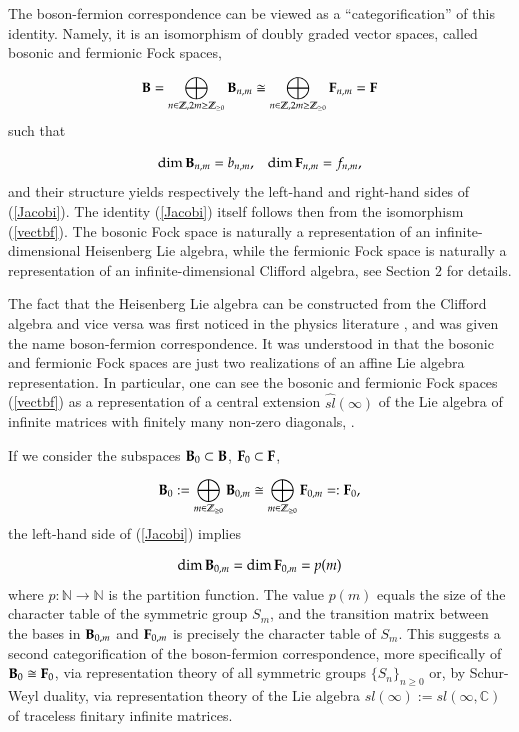 \documentclass[11pt]{amsart}
\newcommand {\ZZ} {\mathbb {Z}}
\newcommand {\NN} {\mathbb {N}}
\begin{document}
The boson-fermion correspondence can be viewed as a ``categorification'' of this identity.
Namely, it is an isomorphism of doubly graded vector spaces, called bosonic and fermionic 
Fock spaces,

\begin{equation}\label{vectbf}
 \bold{B} = \bigoplus_{n \in \ZZ, 2m \geq \ZZ_{\geq 0}} \bold{B}_{n,m} \cong \bigoplus_{n \in \ZZ, 2m \geq \ZZ_{\geq 0}} \bold{F}_{n,m} = \bold{F}
\end{equation}
such that

\begin{equation}\label{vectcons}
  \dim \bold{B}_{n,m} = b_{n,m}, \;\;\;  \dim \bold{F}_{n,m} = f_{n,m},\nonumber
\end{equation}
and their structure yields respectively the left-hand and right-hand sides of (\ref{Jacobi}). The 
identity (\ref{Jacobi}) itself follows then from the isomorphism (\ref{vectbf}). The bosonic Fock space
is naturally a representation of an infinite-dimensional Heisenberg Lie algebra, while the 
fermionic Fock space is naturally a representation of an infinite-dimensional Clifford
algebra, see Section $2$ for details.

The fact that the Heisenberg Lie algebra can be constructed from the Clifford algebra and vice versa was 
first noticed in the physics literature \cite{Mn}, and was given the name boson-fermion correspondence.
It was understood in \cite{F} that the bosonic and fermionic Fock spaces are just two realizations of 
an affine Lie algebra representation. In particular, one can see the bosonic and fermionic Fock
spaces (\ref{vectbf}) as a representation of  a central extension $\widehat{sl}(\infty)$ of the
Lie algebra of infinite matrices with finitely many non-zero diagonals, \cite{DJKM}. 


If we consider the subspaces $ \bold{B}_0\subset  \bold{B}$, $\bold{F}_0\subset \bold{F}$,

\begin{equation}\label{sub}
 \bold{B}_0 := \bigoplus_{m \in\ZZ_{\geq 0}} \bold{B}_{0,m} \cong \bigoplus_{m \in\ZZ_{\geq 0}} \bold{F}_{0,m} =: \bold{F}_0,
\end{equation}
the left-hand side of (\ref{Jacobi}) implies

\begin{equation}\label{subdim}
 \dim \bold{B}_{0,m} = \dim\bold{F}_{0,m} = p(m)\nonumber
\end{equation}
where $p:\NN\to \NN$ is the partition function. The value $p(m)$ equals the size of the character table of the symmetric group $S_m$, and
the transition matrix between the bases in $\bold{B}_{0,m}$ and $\bold{F}_{0,m}$ is precisely the 
character table of $S_m$. This suggests a second categorification of the boson-fermion correspondence, more
specifically of $\bold{B}_0 \cong \bold{F}_0$, via representation theory of all symmetric groups
$\{S_n\}_{n \geq 0}$ or, by Schur-Weyl duality, via representation theory of the Lie algebra $sl(\infty):=sl(\infty,\mathbb C)$ 
of traceless finitary infinite matrices.
\end{document}
